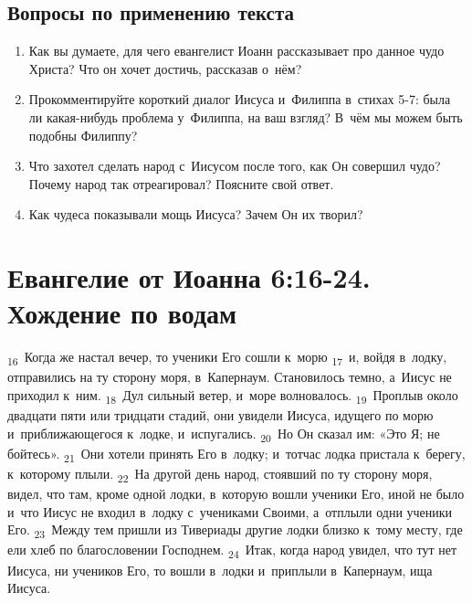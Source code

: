\documentclass[a4paper,12pt]{article}
\begin{document}
\subsection*{Вопросы по применению текста} 
\begin{enumerate}
    \item Как вы думаете, для чего евангелист Иоанн рассказывает про данное чудо Христа? Что он хочет достичь, рассказав о~нём? 
    
    \myline
    
    \myline
    \item Прокомментируйте короткий диалог Иисуса и~Филиппа в~стихах 5-7: была ли какая-нибудь проблема у~Филиппа, на ваш взгляд? В~чём мы можем быть подобны Филиппу?
    
    \myline
    
    \myline
    \item Что захотел сделать народ с~Иисусом после того, как Он совершил чудо? Почему народ так отреагировал? Поясните свой ответ. 
    
    \myline
    
    \myline
    \item Как чудеса показывали мощь Иисуса? Зачем Он их творил? 
    
    \myline
    
    \myline
\end{enumerate}



\section{Евангелие от Иоанна 6:16-24. Хождение по водам}

\textsubscript{16}~Когда же настал вечер, то ученики Его сошли к~морю \textsubscript{17}~и, войдя в~лодку, отправились на ту сторону моря, в~Капернаум. Становилось темно, а~Иисус не приходил к~ним. \textsubscript{18}~Дул сильный ветер, и~море волновалось. \textsubscript{19}~Проплыв около двадцати пяти или тридцати стадий, они увидели Иисуса, идущего по морю и~приближающегося к~лодке, и~испугались. \textsubscript{20}~Но Он сказал им: «Это Я; не бойтесь». \textsubscript{21}~Они хотели принять Его в~лодку; и~тотчас лодка пристала к~берегу, к~которому плыли. \textsubscript{22}~На другой день народ, стоявший по ту сторону моря, видел, что там, кроме одной лодки, в~которую вошли ученики Его, иной не было и~что Иисус не входил в~лодку с~учениками Своими, а~отплыли одни ученики Его. \textsubscript{23}~Между тем пришли из Тивериады другие лодки близко к~тому месту, где ели хлеб по благословении Господнем. \textsubscript{24}~Итак, когда народ увидел, что тут нет Иисуса, ни учеников Его, то вошли в~лодки и~приплыли в~Капернаум, ища Иисуса.
\end{document}
